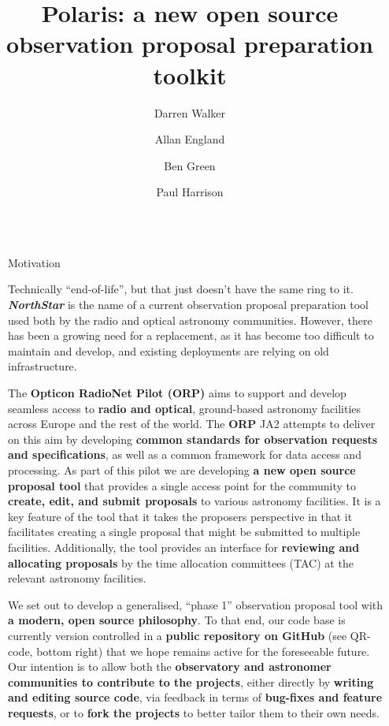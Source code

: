 \documentclass[final]{beamer}
\title{Polaris: a new open source observation proposal preparation toolkit}
\author{Darren Walker \and Allan England \and Ben Green \and Paul Harrison}
\institute[shortinst]{JBCA, The University of Manchester, UK}
\newlength{\sepwidth}
\newlength{\colwidth}
\newcommand{\separatorcolumn}{\begin{column}{\sepwidth}\end{column}}
\begin{document}
    \begin{frame}[t]
        \begin{columns}[t]
            \separatorcolumn

            \begin{column}{\colwidth}

                \begin{block}{Motivation}

                    Technically ``end-of-life'', but that just doesn't have the same ring to it.
                    \textbf{\emph{NorthStar}} is the name of a current observation proposal preparation tool used both
                    by the radio and optical astronomy communities.
                    However, there has been a growing need for a replacement, as
                    it has become too difficult to maintain and develop, and existing deployments are relying on old infrastructure.


                    The \textbf{Opticon RadioNet Pilot (ORP)} aims to support and develop seamless access to
                    \textbf{radio and optical}, ground-based astronomy facilities across Europe and the rest of the
                    world.
                    The \textbf{ORP} JA2 attempts to deliver on this aim by developing \textbf{common standards for observation
                    requests and specifications}, as well as a common framework for data access and processing.
                    As part of this pilot we are developing \textbf{a new open source proposal tool} that provides a
                    single access point for the community to \textbf{create, edit, and submit proposals} to various
                    astronomy facilities.
                    It is a key feature of the tool that it takes the proposers perspective in that it
                    facilitates creating a single proposal that might be submitted to multiple facilities.
                    Additionally, the tool provides an interface for \textbf{reviewing and allocating proposals} by the
                    time allocation committees (TAC) at the relevant astronomy facilities.

                    We set out to develop a generalised, ``phase 1'' observation proposal tool with
                    \textbf{a modern, open source philosophy}.
                    To that end, our code base is currently version controlled in a
                    \textbf{public repository on GitHub} (see QR-code, bottom right) that we hope remains active for
                    the foreseeable future.
                    Our intention is to allow both the
                    \textbf{observatory and astronomer communities to contribute to the projects},
                    either directly by \textbf{writing and editing source code}, via feedback in terms of
                    \textbf{bug-fixes and feature requests}, or to \textbf{fork the projects} to better tailor them to
                    their own needs.


\end{block}
\end{column}
\end{columns}
\end{frame}
\end{document}
